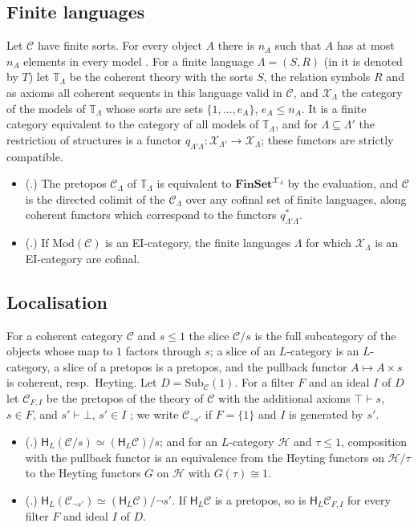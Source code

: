 \documentclass[11pt]{amsart}
\theoremstyle{definition}
\newcommand{\Fin}{\mathbf{FinSet}}
\newcommand{\Sub}{\mathrm{Sub}}
\newcommand{\Mod}{\mathrm{Mod}}
\newcommand{\HH}{\mathsf H}
\newcommand{\cX}{\mathcal X}
\newcommand{\cC}{\mathcal C}
\newcommand{\cH}{\mathcal H}
\newcommand{\bT}{\mathbb T}
\begin{document}
\subsection*{Finite languages}
Let $\cC$ have finite sorts. For every object $A$ there is $n_A$ such
that $A$ has at most $n_A$ elements in every model
\cite[Lemma~4.1]{Finsorts}. For a finite language $\Lambda=(S,R)$ (in
\cite{Finsorts} it is denoted by $T$) let $\bT_\Lambda$ be the
coherent theory with the sorts $S$, the relation symbols $R$ and as
axioms all coherent sequents in this language valid in $\cC$, and
$\cX_\Lambda$ the category of the models of $\bT_\Lambda$ whose sorts
are sets $\{1,\dots,e_A\}$, $e_A\le n_A$. It is a finite category
equivalent to the category of all models of $\bT_\Lambda$, and for
$\Lambda\subseteq\Lambda'$ the restriction of structures is a functor
$q_{\Lambda'\Lambda}\colon\cX_{\Lambda'}\to\cX_\Lambda$; these
functors are strictly compatible.
\begin{itemize}
\item[(R12)] (\cite[Prop.~5.1, Lemma~5.2]{Finsorts}.) The pretopos
$\cC_\Lambda$ of $\bT_\Lambda$ is equivalent to $\Fin^{\cX_\Lambda}$
by the evaluation, and $\cC$ is the directed colimit of the
$\cC_\Lambda$ over any cofinal set of finite languages, along coherent
functors which correspond to the functors $q_{\Lambda'\Lambda}^*$.
\item[(R13)] (\cite[Prop.~5.4]{Finsorts}.) If $\Mod(\cC)$ is an
EI-category, the finite languages $\Lambda$ for which $\cX_\Lambda$ is
an EI-category are cofinal.
\end{itemize}

\subsection*{Localisation}
For a coherent category $\cC$ and $s\le1$ the slice $\cC/s$ is the
full subcategory of the objects whose map to $1$ factors through $s$;
a slice of an $L$-category is an $L$-category, a slice of a pretopos is
a pretopos, and the pullback functor $A\mapsto A\times s$ is coherent,
resp.\ Heyting. Let $D=\Sub_\cC(1)$. For a filter $F$ and an ideal $I$
of $D$ let $\cC_{F,I}$ be the pretopos of the theory of $\cC$ with the
additional axioms $\top\vdash s$, $s\in F$, and $s'\vdash\bot$, $s'\in
I$ \cite[\S4]{Proftrees}; we write $\cC_{\neg s'}$ if $F=\{1\}$ and
$I$ is generated by $s'$.
\begin{itemize}
\item[(R14)] (\cite[Lemma~4.1]{Proftrees}.) $\HH_L(\cC/s)\simeq
(\HH_L\cC)/s$; and for an $L$-category $\cH$ and $\tau\le1$,
composition with the pullback functor is an equivalence from the
Heyting functors on $\cH/\tau$ to the Heyting functors $G$ on $\cH$
with $G(\tau)\cong1$.
\item[(R15)] (\cite[Lemma~4.2, Thm.~4.3]{Proftrees}.) $\HH_L(\cC_{\neg
s'})\simeq(\HH_L\cC)/\neg s'$. If $\HH_L\cC$ is a pretopos, so is
$\HH_L\cC_{F,I}$ for every filter $F$ and ideal $I$ of $D$.
\end{itemize}
\end{document}
